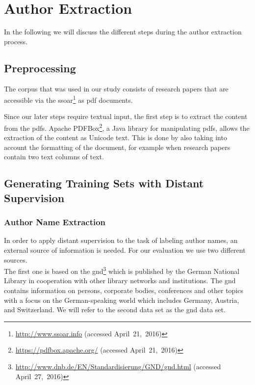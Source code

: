 \chapter{Author Extraction}\label{cha:author-extraction}

In the following we will discuss the different steps during the author extraction process.

\section{Preprocessing}\label{sec:ae-preprocessing}

The corpus that was used in our study consists of  research papers that are accessible via the \gls{ssoar}\footnote{\url{http://www.ssoar.info} (accessed April~21,~2016)} as \gls{pdf} documents.

Since our later steps require textual input, the first step is to extract the content from the \glspl{pdf}.
Apache PDFBox\footnote{\url{https://pdfbox.apache.org/} (accessed April~21,~2016)}, a Java library for manipulating \glspl{pdf}, allows the extraction of the content as Unicode text.
This is done by also taking into account the formatting of the document, for example when research papers contain two text columns of text.

\section{Generating Training Sets with Distant Supervision}\label{sec:ae-distant-supervision}

\subsection{Author Name Extraction}

In order to apply distant supervision to the task of labeling author names, an external source of information is needed.
For our evaluation we use two different sources.\\

The first one is based on the \acrfull{gnd}\footnote{\url{http://www.dnb.de/EN/Standardisierung/GND/gnd.html} (accessed April~27,~2016)} which is published by the German National Library in cooperation with other library networks and institutions.
The \gls{gnd} contains information on persons, corporate bodies, conferences and other topics with a focus on the German-speaking world which includes Germany, Austria, and Switzerland.
We will refer to the second data set as the \gls{gnd} data set.\\

